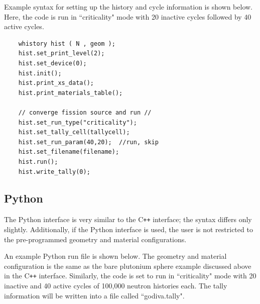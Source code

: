 \documentclass[twoside,a4paper]{refart}
\begin{document}
Example syntax for setting up the history and cycle information is shown below. Here, the code is run in
``criticality" mode with 20 inactive cycles followed by 40 active cycles.

\begin{verbatim}
	whistory hist ( N , geom );
	hist.set_print_level(2);
	hist.set_device(0);
	hist.init();
	hist.print_xs_data();
	hist.print_materials_table();

	// converge fission source and run //
	hist.set_run_type("criticality");
	hist.set_tally_cell(tallycell);
	hist.set_run_param(40,20);  //run, skip
	hist.set_filename(filename);
	hist.run();
	hist.write_tally(0);
\end{verbatim}

\subsection{Python}

The Python interface is very similar to the C\texttt{++} interface; the syntax differs only slightly.
Additionally, if the Python interface is used, the user is not restricted to the pre-programmed 
geometry and material configurations.

An example Python run file is shown below. The geometry and material configuration is the same as the
bare plutonium sphere example discussed above in the C\texttt{++} interface. Similarly, the code is set
to run in ``criticality" mode with 20 inactive and 40 active cycles of 100,000 neutron histories each.
The tally information will be written into a file called ``godiva.tally".
\end{document}
